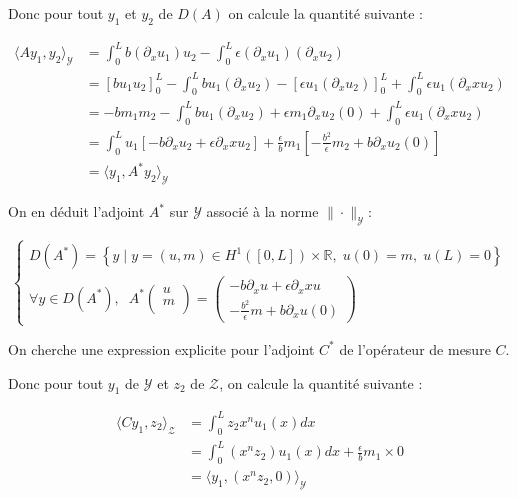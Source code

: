 \documentclass[a4paper]{article}
\newcommand{\dep}{b}
\begin{document}
Donc pour tout $y_1$ et $y_2$ de $D(A)$ on calcule la quantité suivante :

\[ \begin{split}
\langle Ay_1,y_2 \rangle_{\mathscr{Y}} &= \int_0^L \dep (\partial_x u_1)u_2
                                     - \int_0^L \epsilon (\partial_x u_1)(\partial_x u_2)\\
					&= [\dep u_1u_2]_0^L
						- \int_0^L \dep u_1(\partial_x u_2)
						-[\epsilon u_1 (\partial_x u_2)]_0^L
						+ \int_0^L \epsilon u_1(\partial_xx u_2)\\
					&= -\dep m_1m_2
						- \int_0^L \dep u_1(\partial_x u_2)
						+\epsilon m_1 \partial_x u_2(0)
						+ \int_0^L \epsilon u_1(\partial_xx u_2)\\
					&= \int_0^L u_1 [- \dep \partial_x u_2 + \epsilon \partial_xx u_2]
						+ \displaystyle \frac{\epsilon}{\dep} m_1 
						[-\frac{\dep^2}{\epsilon} m_2 + \dep \partial_x u_2(0)]\\
					&= \langle y_1, A^* y_2 \rangle_{\mathscr{Y}}
\end{split} \]

On en déduit l'adjoint $A^*$ sur $\mathscr{Y}$ associé à la norme $\| \cdot \|_{\mathscr{Y}}$:

\begin{equation}
	\begin{cases}
		D(A^*) = \left\{ y \; | \; y = (u,m) \in H^1([0,L])\times \mathbb{R},
 \; u(0)=m, \; u(L)=0 \right\} \\
        \forall y \in D(A^*), \; \;
	A^* \left( \begin{array}{c}
		u\\
		m\\
		\end{array} \right) 
		= \left(\begin{array}{c}
		- \dep \partial_x u + \epsilon \partial_xx u\\
		-\displaystyle \frac{\dep^2}{\epsilon} m + \dep \partial_x u(0)
		\end{array}\right)
	\end{cases}
\end{equation}

On cherche une expression explicite 
pour l'adjoint $C^*$ de l'opérateur de mesure $C$.

Donc pour tout $y_1$ de $\mathscr{Y}$ et $z_2$ de $\mathscr{Z}$,
on calcule la quantité suivante :

\[ \begin{split}
\langle Cy_1,z_2 \rangle_{\mathscr{Z}} &= \int_0^L z_2 x^n u_1(x)dx\\
                                       &= \int_0^L  (x^n z_2) u_1(x)dx + \displaystyle \frac{\epsilon}{\dep} m_1 \times 0 \\
									   &=  \langle y_1 , (x^n z_2, 0) \rangle_{\mathscr{Y}}
\end{split} \]
\end{document}
